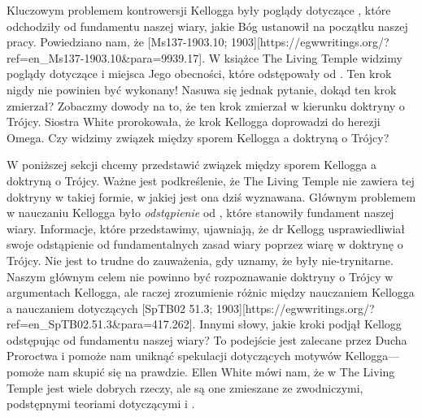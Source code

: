 
Kluczowym problemem kontrowersji  Kellogga były poglądy dotyczące , które odchodziły od fundamentu naszej wiary, jakie Bóg ustanowił na początku naszej pracy. Powiedziano nam, że [Ms137-1903.10; 1903][https://egwwritings.org/?ref=en\_Ms137-1903.10&para=9939.17]. W książce The Living Temple widzimy poglądy dotyczące  i miejsca Jego obecności, które odstępowały od . Ten krok nigdy nie powinien być wykonany! Nasuwa się jednak pytanie, dokąd ten krok zmierzał? Zobaczmy dowody na to, że ten krok zmierzał w kierunku doktryny o Trójcy. Siostra White prorokowała, że krok Kellogga doprowadzi do herezji Omega. Czy widzimy związek między sporem Kellogga a doktryną o Trójcy?

W poniższej sekcji chcemy przedstawić związek między sporem Kellogga a doktryną o Trójcy. Ważne jest podkreślenie, że The Living Temple nie zawiera tej doktryny w takiej formie, w jakiej jest ona dziś wyznawana. Głównym problemem w nauczaniu Kellogga było \textit{odstąpienie} od , które stanowiły fundament naszej wiary. Informacje, które przedstawimy, ujawniają, że dr Kellogg usprawiedliwiał swoje odstąpienie od fundamentalnych zasad wiary poprzez wiarę w doktrynę o Trójcy. Nie jest to trudne do zauważenia, gdy uznamy, że  były nie-trynitarne. Naszym głównym celem nie powinno być rozpoznawanie doktryny o Trójcy w argumentach Kellogga, ale raczej zrozumienie różnic między nauczaniem Kellogga a nauczaniem  dotyczących [SpTB02 51.3; 1903][https://egwwritings.org/?ref=en\_SpTB02.51.3&para=417.262]. Innymi słowy, jakie kroki podjął Kellogg odstępując od fundamentu naszej wiary? To podejście jest zalecane przez Ducha Proroctwa i pomoże nam uniknąć spekulacji dotyczących motywów Kellogga—pomoże nam skupić się na prawdzie. Ellen White mówi nam, że w The Living Temple jest wiele dobrych rzeczy, ale są one zmieszane ze zwodniczymi, podstępnymi teoriami dotyczącymi  i .

